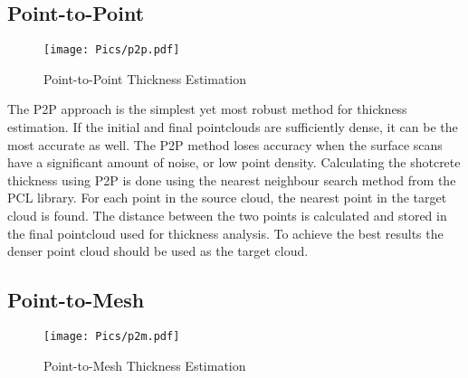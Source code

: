 \subsection{Point-to-Point}
\begin{figure}[h!]
    \centering
    \texttt{[image: Pics/p2p.pdf]}
    \caption{Point-to-Point Thickness Estimation}
    \label{fig:p2pdia}
\end{figure}
The P2P approach is the simplest yet most robust method for thickness estimation. If the initial and final pointclouds are sufficiently dense, it can be the most accurate as well. The P2P method loses accuracy when the surface scans have a significant amount of noise, or low point density. Calculating the shotcrete thickness using P2P is done using the nearest neighbour search method from the PCL library. For each point in the source cloud, the nearest point in the target cloud is found. The distance between the two points is calculated and stored in the final pointcloud used for thickness analysis. To achieve the best results the denser point cloud should be used as the target cloud.\\
\subsection{Point-to-Mesh}
\begin{figure}[h!]
    \centering
    \texttt{[image: Pics/p2m.pdf]}
    \caption{Point-to-Mesh Thickness Estimation}
    \label{fig:p2mdia}
\end{figure}

